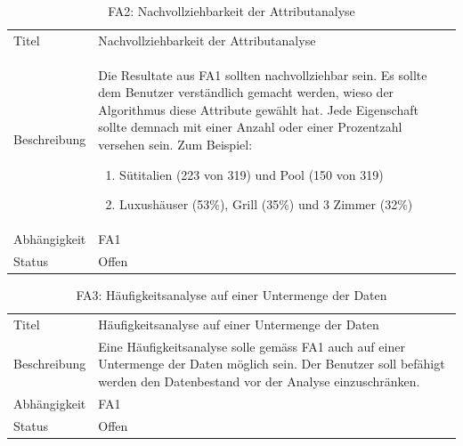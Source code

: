 \begin{table}[H] 
	\caption{FA2: Nachvollziehbarkeit der Attributanalyse}
	\centering
	\label{fig:anforderungsanalyse:funktionaleanforderung:fa2}
	\begin{tabular}{ | l | L{10cm} | } 
		\hline 
		 \\ \hline 
		Titel & Nachvollziehbarkeit der Attributanalyse \\ \hline 
		Beschreibung & Die Resultate aus FA1 sollten nachvollziehbar sein. Es sollte dem Benutzer verständlich gemacht werden, wieso der Algorithmus diese Attribute gewählt hat. Jede Eigenschaft sollte demnach mit einer Anzahl oder einer Prozentzahl versehen sein. Zum Beispiel:
			\begin{enumerate}
			\item Sütitalien (223 von 319) und Pool (150 von 319)
			\item Luxushäuser (53\%), Grill (35\%) und 3 Zimmer (32\%)
			\end{enumerate} \\ \hline 
		Abhängigkeit & FA1 \\ \hline 
		Status & Offen \\ \hline 
	\end{tabular}
\end{table}

\begin{table}[H] 
	\caption{FA3: Häufigkeitsanalyse auf einer Untermenge der Daten}
	\centering
	\label{fig:anforderungsanalyse:funktionaleanforderung:fa3}
	\begin{tabular}{ | l | L{10cm} | } 
		\hline 
		 \\ \hline 
		Titel & Häufigkeitsanalyse auf einer Untermenge der Daten \\ \hline 
		Beschreibung & Eine Häufigkeitsanalyse solle gemäss FA1 auch auf einer Untermenge der Daten möglich sein. Der Benutzer soll befähigt werden den Datenbestand vor der Analyse einzuschränken. \\ \hline 
		Abhängigkeit & FA1 \\ \hline 
		Status & Offen \\ \hline 
	\end{tabular}
\end{table}

